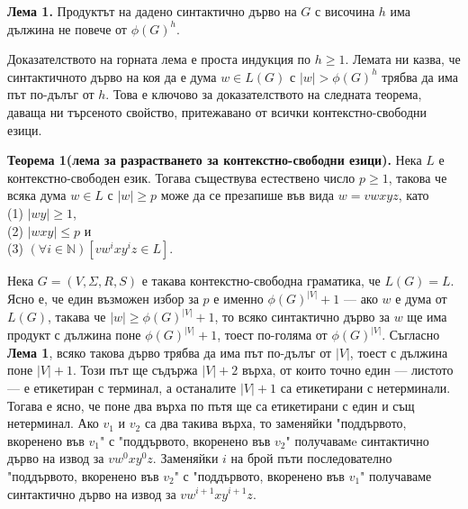 \documentclass[openany]{book}
\begin{document}
\vspace{15pt}

\textbf{Лема 1.} Продуктът на дадено синтактично дърво на $G$ с височина $h$ има дължина
не повече от $\phi(G)^h$.

\vspace{15pt}
\hspace{15pt} Доказателството на горната лема е проста индукция по $h \geq 1$. Лемата 
ни казва, че синтактичното дърво на коя да е дума $w \in L(G)$ с $|w| > \phi(G)^h$ трябва да
има път по-дълъг от $h$. Това е ключово за доказателството на следната теорема, 
даваща ни търсеното свойство, притежавано от всички контекстно-свободни езици. \\

\vspace{15pt}

\textbf{Теорема 1(лема за разрастването за контекстно-свободни езици).} Нека 
$L$ е контекстно-свободен език. Тогава съществува естествено 
число $p \geq 1$, такова че всяка дума $w \in L$ с $|w| \geq p$ може да се презапише
във вида $w = vwxyz$, като \\
(1) $|wy| \geq 1$, \\
(2) $|wxy| \leq p$ и \\
(3) $(\forall i \in \mathbb{N})[vw^ixy^iz \in L]$. \\

\vspace{15pt}

\hspace{15pt}Нека $G = (V,\Sigma,R,S)$ е такава контекстно-свободна граматика, че $L(G) = L$. 
Ясно е, че един възможен избор за $p$ е именно $\phi(G)^{|V|}+1$ — ако $w$ е дума от 
$L(G)$, такава че $|w| \geq \phi(G)^{|V|}+1$, то всяко синтактично дърво за $w$ ще има
продукт с дължина поне $\phi(G)^{|V|}+1$, тоест по-голяма от $\phi(G)^{|V|}$. Съгласно
\textbf{Лема 1}, всяко такова дърво трябва да има път по-дълъг от $|V|$, тоест с дължина
поне $|V| + 1$. Този път ще съдържа $|V| + 2$ върха, от които точно един — листото — е 
етикетиран с терминал, а останалите $|V| + 1$ са етикетирани с нетерминали. Тогава е
ясно, че поне два върха по пътя ще са етикетирани с един и същ нетерминал. Ако 
$v_1$ и $v_2$ са два такива върха, то заменяйки "поддървото, вкоренено във $v_1$" \hspace{0,01cm} с
"поддървото, вкоренено във $v_2$" \hspace{0,01cm} получавамe синтактично дърво на извод за $vw^0xy^0z$.
Заменяйки $i$ на брой пъти последователно "поддървото, вкоренено във $v_2$" \hspace{0,01cm} с
"поддървото, вкоренено във $v_1$" \hspace{0,01cm} получаваме синтактично дърво на извод
за $vw^{i+1}xy^{i+1}z$.
\end{document}
